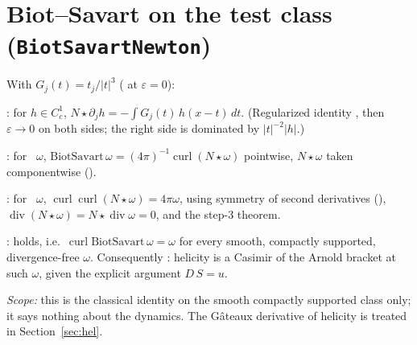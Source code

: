 \documentclass[11pt]{article}
\begin{document}
\section{Biot--Savart on the test class (\texttt{BiotSavartNewton})}
With $G_j(t)=t_j/|t|^3$ (\coined{} at $\varepsilon=0$):
\begin{theorem}\coined: for $h\in C^1_c$, $N\star\partial_jh=-\int G_j(t)\,h(x-t)\,dt$. (Regularized identity , then $\varepsilon\to0$ on both sides; the right side is dominated by $|t|^{-2}|h|$.)\end{theorem}
\begin{theorem}[Step 5]\coined: for ~$\omega$, $\mathrm{BiotSavart}\,\omega=(4\pi)^{-1}\operatorname{curl}(N\star\omega)$ pointwise, $N\star\omega$ taken componentwise ().\end{theorem}
\begin{theorem}[Step 4]\coined: for ~$\omega$, $\operatorname{curl}\operatorname{curl}(N\star\omega)=4\pi\omega$, using symmetry of second derivatives (), $\operatorname{div}(N\star\omega)=N\star\operatorname{div}\omega=0$, and the step-3 theorem.\end{theorem}
\begin{theorem}\coined:  holds, i.e.\ $\operatorname{curl}\mathrm{BiotSavart}\,\omega=\omega$ for every smooth, compactly supported, divergence-free $\omega$. Consequently \coined: helicity is a Casimir of the Arnold bracket at such $\omega$, given the explicit argument $D\,S=u$.\end{theorem}
\noindent\emph{Scope:} this is the classical identity on the smooth compactly supported class only; it says nothing about the dynamics. The G\^ateaux derivative of helicity is treated in Section~\ref{sec:hel}.
\end{document}
